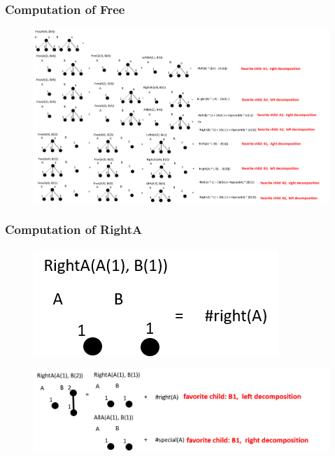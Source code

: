 \documentclass{beamer}
\begin{document}
\begin{frame}
\frametitle{Computation of Free}
\begin{figure}
	\includegraphics[width=1.0\linewidth]{Free_4_4}
	\label{Free_4_4} 
	\centering
\end{figure}

\end{frame}

\begin{frame}
\frametitle{Computation of RightA}
\begin{figure}
	\includegraphics[width=0.4\linewidth]{RightA_1_1}
	\label{RightA_1_1} 
	\centering
\end{figure}
\begin{figure}
	\includegraphics[width=1.1\linewidth]{RightA_1_2}
	\label{RightA_1_2} 
	\centering
\end{figure}

\end{frame}
\end{document}
